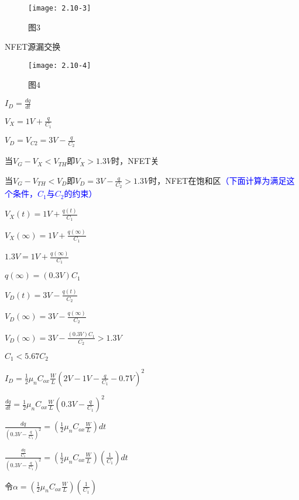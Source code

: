 \color{black}{
	
}

\scalebox{3}{（b）}

		\begin{figure}[H] %
	\begin{minipage}{\linewidth}
		\texttt{[image: 2.10-3]}
	\end{minipage}
	\caption*{图3} %
\end{figure}

NFET源漏交换

\begin{figure}[H] %
	\begin{minipage}{\linewidth}
		\texttt{[image: 2.10-4]}
	\end{minipage}
	\caption*{图4} %
\end{figure}

$I_D=\frac{dq}{dt}$

$V_X=1V+\frac{q}{C_1}$

$V_D=V_{C2}=3V-\frac{q}{C_2}$

当$V_G-V_X<V_{TH}$即$V_X>1.3V$时，NFET关

当$V_G-V_{TH}<V_D$即$V_D=3V-\frac{q}{C_2}>1.3V$时，NFET在饱和区\textcolor{blue}{（下面计算为满足这个条件，$C_1$与$C_2$的约束）}

$V_X(t)=1V+\frac{q(t)}{C_1}$

$V_X(\infty)=1V+\frac{q(\infty)}{C_1}$

$1.3V=1V+\frac{q(\infty)}{C_1}$

$q(\infty)=(0.3V)C_1$

$V_D(t)=3V-\frac{q(t)}{C_2}$

$V_D(\infty)=3V-\frac{q(\infty)}{C_2}$

$V_D(\infty)=3V-\frac{(0.3V)C_1}{C_2}>1.3V$

$C_1<5.67C_2$

$I_D=\frac{1}{2}\mu_nC_{ox}\frac{W}{L}(2V-1V-\frac{q}{C_1}-0.7V)^2$

$\frac{dq}{dt}=\frac{1}{2}\mu_nC_{ox}\frac{W}{L}(0.3V-\frac{q}{C_1})^2$

$\frac{dq}{(0.3V-\frac{q}{C_1})^2}=(\frac{1}{2}\mu_nC_{ox}\frac{W}{L})dt$

$\frac{\frac{dq}{C_1}}{(0.3V-\frac{q}{C_1})^2}=(\frac{1}{2}\mu_nC_{ox}\frac{W}{L})(\frac{1}{C_1})dt$

令$\alpha=(\frac{1}{2}\mu_nC_{ox}\frac{W}{L})(\frac{1}{C_1})$

